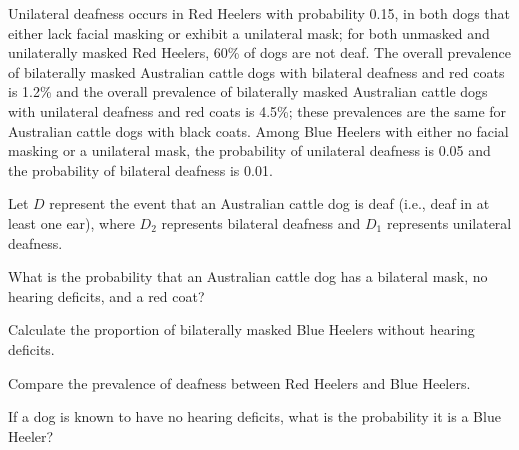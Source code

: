 {\begin{parts}
		\item Unilateral deafness occurs in Red Heelers with probability 0.15, in both dogs that either lack facial masking or exhibit a unilateral mask; for both unmasked and unilaterally masked Red Heelers, 60\% of dogs are not deaf. The overall prevalence of bilaterally masked Australian cattle dogs with bilateral deafness and red coats is 1.2\% and the overall prevalence of bilaterally masked Australian cattle dogs with unilateral deafness and red coats is 4.5\%; these prevalences are the same for Australian cattle dogs with black coats. Among Blue Heelers with either no facial masking or a unilateral mask, the probability of unilateral deafness is 0.05 and the probability of bilateral deafness is 0.01. 
		
		Let $D$ represent the event that an Australian cattle dog is deaf (i.e., deaf in at least one ear), where $D_2$ represents bilateral deafness and $D_1$ represents unilateral deafness. 
		
		\begin{subparts}
			
			\item What is the probability that an Australian cattle dog has a bilateral mask, no hearing deficits, and a red coat?
			
			\item Calculate the proportion of bilaterally masked Blue Heelers without hearing deficits.
			
			\item Compare the prevalence of deafness between Red Heelers and Blue Heelers.
			
			\item If a dog is known to have no hearing deficits, what is the probability it is a Blue Heeler?
			
		\end{subparts}
		
	\end{parts}

}{}

